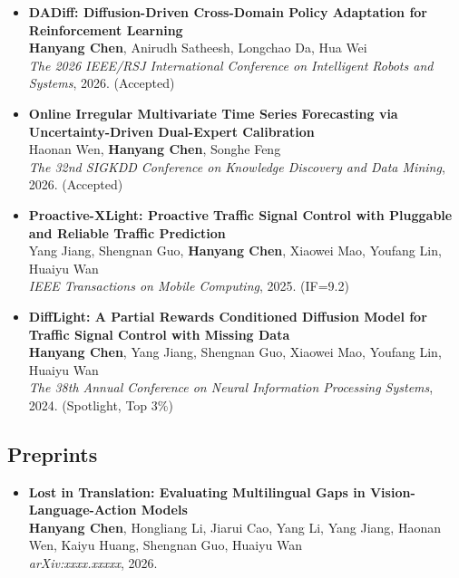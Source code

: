 \documentclass[11pt,a4paper,roman]{moderncv}        %
\begin{document}
	\begin{itemize}
		\item[\textbullet] \textbf{DADiff: Diffusion-Driven Cross-Domain Policy Adaptation for Reinforcement Learning} \\
		\textbf{Hanyang Chen}, Anirudh Satheesh, Longchao Da, Hua Wei \\
		\emph{The 2026 IEEE/RSJ International Conference on Intelligent Robots and Systems}, 2026. (Accepted)
		\vspace{1mm}
		\item[\textbullet] \textbf{Online Irregular Multivariate Time Series Forecasting via Uncertainty-Driven Dual-Expert Calibration} \\
		Haonan Wen, \textbf{Hanyang Chen}, Songhe Feng \\
		\emph{The 32nd SIGKDD Conference on Knowledge Discovery and Data Mining}, 2026. (Accepted)
		\vspace{1mm}
        \item[\textbullet] \textbf{Proactive-XLight: Proactive Traffic Signal Control with Pluggable and Reliable Traffic Prediction} \\
		Yang Jiang, Shengnan Guo, \textbf{Hanyang Chen}, Xiaowei Mao, Youfang Lin, Huaiyu Wan \\
		\emph{IEEE Transactions on Mobile Computing}, 2025. (IF=9.2)
		\vspace{1mm}
        \item[\textbullet] \textbf{DiffLight: A Partial Rewards Conditioned Diffusion Model for Traffic Signal Control with Missing Data} \\
		\textbf{Hanyang Chen}, Yang Jiang, Shengnan Guo, Xiaowei Mao, Youfang Lin, Huaiyu Wan \\
		\emph{The 38th Annual Conference on Neural Information Processing Systems}, 2024. (Spotlight, Top 3\%)
   \end{itemize}

    \subsection*{Preprints}
    \vspace{2mm}

	\begin{itemize}
		\item[\textbullet] \textbf{Lost in Translation: Evaluating Multilingual Gaps in Vision-Language-Action Models} \\
		\textbf{Hanyang Chen}, Hongliang Li, Jiarui Cao, Yang Li, Yang Jiang, Haonan Wen, Kaiyu Huang, Shengnan Guo, Huaiyu Wan \\
		\emph{arXiv:xxxx.xxxxx}, 2026.
   \end{itemize}
\end{document}
